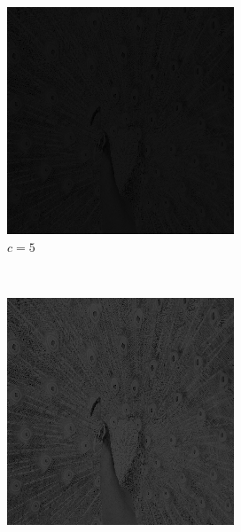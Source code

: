 \documentclass{article}
\begin{document}
\begin{enumerate}[label=(\alph*)]
    \begin{figure}[!htb]
        \centering
        \begin{subfigure}[b]{0.3\textwidth}
            \includegraphics[width=\textwidth]{img/LT5.png}
            \caption{$c = 5$}
        \end{subfigure}
        ~
        \begin{subfigure}[b]{0.3\textwidth}
            \includegraphics[width=\textwidth]{img/LT15.png}

\end{subfigure}
\end{figure}
\end{enumerate}
\end{document}
